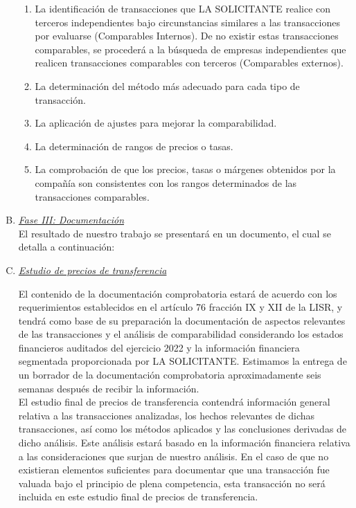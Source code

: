 \documentclass[5pt,letter]{report}
\begin{document}
\begin{enumerate}[A)]
\begin{enumerate}[1.]
\item La identificación de transacciones que LA SOLICITANTE realice con terceros independientes bajo circunstancias similares a las transacciones por evaluarse (Comparables Internos). De no existir estas transacciones comparables, se procederá a la búsqueda de empresas independientes que realicen transacciones comparables con terceros (Comparables externos). 


\item La determinación del método más adecuado para cada tipo de transacción. 

\item La aplicación de ajustes para mejorar la comparabilidad. 

\item La determinación de rangos de precios o tasas. 

\item La comprobación de que los precios, tasas o márgenes obtenidos por la compañía son consistentes con los rangos determinados de las transacciones comparables. 

\end{enumerate}


\item \textit{\underline{Fase III: Documentación}} \\[5pt]

El resultado de nuestro trabajo se presentará en un documento, el cual se detalla a continuación: 

\item \textit{\underline{Estudio de precios de transferencia}} 

El contenido de la documentación comprobatoria estará de acuerdo con los requerimientos establecidos en el artículo 76 fracción IX y XII de la LISR, y tendrá como base de su preparación la documentación de aspectos relevantes de las transacciones y el análisis de comparabilidad considerando los estados financieros auditados del ejercicio 2022 y la información financiera segmentada proporcionada por LA SOLICITANTE. Estimamos la entrega de un borrador de la documentación comprobatoria aproximadamente seis semanas después de recibir la información.\\[5pt] 

El estudio final de precios de transferencia contendrá información general relativa a las transacciones analizadas, los hechos relevantes de dichas transacciones, así como los métodos aplicados y las conclusiones derivadas de dicho análisis. Este análisis estará basado en la información financiera relativa a las consideraciones que surjan de nuestro análisis. En el caso de que no existieran elementos suficientes para documentar que una transacción fue valuada bajo el principio de plena competencia, esta transacción no será incluida en este estudio final de precios de transferencia.\\[5pt] 


\end{enumerate}
\end{document}
